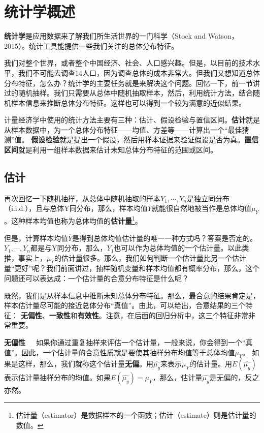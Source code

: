 \documentclass[cn,10pt,math=newtx,citestyle=gb7714-2015,bibstyle=gb7714-2015]{elegantbook}
\begin{document}
	
	\section{统计学概述}
	\textbf{统计学}是应用数据来了解我们所生活世界的一门科学（Stock and Watson，2015）。统计工具能提供一些我们关注的总体分布特征。
	
	我们对整个世界，或者整个中国经济、社会、人口感兴趣。但是，以目前的技术水平，我们不可能去调查14人口，因为调查总体的成本非常大。但我们又想知道总体分布特征，怎么办？统计学的主要任务就是来解决这个问题。回忆一下，前一节讲过的随机抽样。我们只需要从总体中随机抽取样本，然后，利用统计方法，结合随机样本信息来推断总体分布特征。这样也可以得到一个较为满意的近似结果。
	
	计量经济学中使用的统计方法主要有三种：估计、假设检验与置信区间。\textbf{估计}就是从样本数据中，为一个总体分布特征——均值、方差等——计算出一个“最佳猜测”值。
	\textbf{假设检验}就是提出一个假设，然后用样本证据来验证假设是否为真。\textbf{置信区间}就是利用一组样本数据来估计未知总体分布特征的范围或区间。
	
	\subsection{估计}
	再次回忆一下随机抽样，从总体中随机抽取的样本$Y_1,\cdots,Y_n$是独立同分布（i.i.d.），且与总体Y同分布，那么，样本均值$\overline{Y}$就能很自然地被当作是总体均值$\mu_Y$。这种样本均值也称为总体均值的\textbf{估计量}\footnote{估计量（estimator）是数据样本的一个函数；估计（estimate）则是估计量的数值。}。
	
	但是，计算样本均值$\overline{Y}$是得到总体均值估计量的唯一一种方式吗？答案是否定的。$Y_1,\cdots,Y_n$都是与Y同分布，那么，$Y_1$也可以作为总体均值的一个估计量。以此类推，事实上，$\mu_Y$的估计量很多。那么，我们如何判断一个估计量比另一个估计量“更好”呢？我们前面讲过，抽样随机变量和样本均值都有概率分布，那么，这个问题还可以表达成：一个估计量的合意分布特征是什么呢？
	
	既然，我们是从样本信息中推断未知总体分布特征。那么，最合意的结果肯定是，样本估计量尽可能的接近总体分布“真值”。由此，可以给出，合意结果的三个特征：
	\textbf{无偏性}、\textbf{一致性}和\textbf{有效性}。注意，在后面的回归分析中，这三个特征非常非常重要。
	
	\textbf{无偏性}~~~如果你通过重复抽样来评估一个估计量，一般来说，你会得到一个“真值”。因此，一个估计量的合意性质就是要使其抽样分布均值等于总体均值$\mu_Y$。 如果是这样，那么，我们就称这个估计量\textbf{无偏}。用$\hat{\mu_y}$来表示$\mu_Y$的估计量。用$E(\hat{\mu_y})$表示估计量抽样分布的均值。如果$E(\hat{\mu_y})=\mu_Y$，那么，估计量$\hat{\mu_y}$是无偏的，反之亦然。
	
\end{document}
